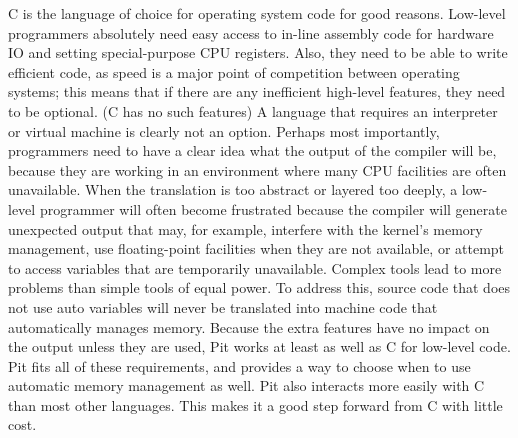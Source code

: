C is the language of choice for operating system code for good reasons.  Low-level programmers absolutely need easy
access to in-line assembly code for hardware IO and setting special-purpose CPU registers.  Also, they need to be able
to write efficient code, as speed is a major point of competition between operating systems; this means that if there
are any inefficient high-level features, they need to be optional.  (C has no such features)  A language that requires an
interpreter or virtual machine is clearly not an option.  Perhaps most importantly, programmers need to have a clear idea what
the output of the compiler will be, because they are working in an environment where many CPU facilities are often
unavailable.  When the translation is too abstract or layered too deeply, a low-level programmer will often become
frustrated because the compiler will generate unexpected output that may, for example, interfere with the kernel's memory
management, use floating-point facilities when they are not available, or attempt to access variables that are
temporarily unavailable.  Complex tools lead to more problems than simple tools of equal power.  To address this,
source code that does not use auto variables will never be translated into machine code that automatically manages
memory.  Because the extra features have no impact on the output unless they are used, Pit works at least as well as C for
low-level code.  Pit fits all of these requirements, and provides a way to choose when to use automatic memory
management as well.  Pit also interacts more easily with C than most other languages.  This makes it a good step
forward from C with little cost.

